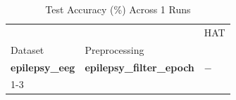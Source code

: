 \begin{table}
\caption{Test Accuracy (\%) Across 1 Runs}
\label{tab:results_acc}
\begin{tabular}{lll}
\toprule
 &  & HAT \\
Dataset & Preprocessing &  \\
\midrule
\textbf{epilepsy_eeg} & \textbf{epilepsy_filter_epoch} & $-$ \\
\cline{1-3}
\bottomrule
\end{tabular}
\end{table}
